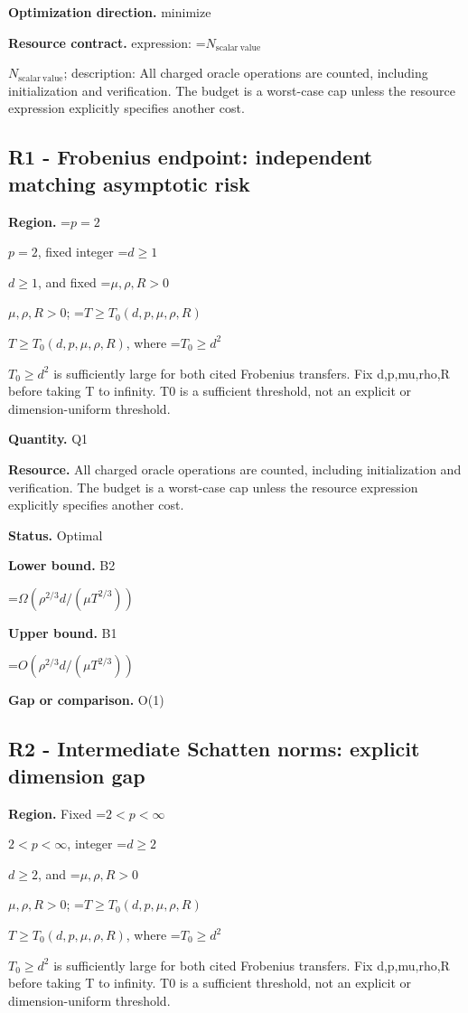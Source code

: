 \documentclass[10pt,a4paper]{article}
\newcommand{\AtlasMath}[1]{\par\begingroup\centering\setbox0=\hbox{$\displaystyle #1$}\ifdim\wd0>1.4\linewidth\typeout{ATLAS WIDE FORMULA: \the\wd0}\fi\ifdim\wd0>\linewidth\resizebox{\linewidth}{!}{\box0}\else\box0\fi\par\endgroup}
\newcommand{\AtlasInlineMath}[1]{\begingroup\setbox0=\hbox{$#1$}\ifdim\wd0>.4\linewidth\endgroup\AtlasMath{#1}\else\endgroup$#1$\fi}
\begin{document}
\textbf{Optimization direction.} minimize



\textbf{Resource contract.} expression: \AtlasInlineMath{N_{\mathrm{scalar\ value}}}; description: All charged oracle operations are counted, including initialization and verification. The budget is a worst-case cap unless the resource expression explicitly specifies another cost.



\subsection{R1 - Frobenius endpoint: independent matching asymptotic risk}


\textbf{Region.} \AtlasInlineMath{p=2}, fixed integer \AtlasInlineMath{d\ge1}, and fixed \AtlasInlineMath{\mu,\rho,R>0}; \AtlasInlineMath{T\ge T_0(d,p,\mu,\rho,R)}, where \AtlasInlineMath{T_0\ge d^2} is sufficiently large for both cited Frobenius transfers. Fix d,p,mu,rho,R before taking T to infinity. T0 is a sufficient threshold, not an explicit or dimension-uniform threshold.



\textbf{Quantity.} Q1



\textbf{Resource.} All charged oracle operations are counted, including initialization and verification. The budget is a worst-case cap unless the resource expression explicitly specifies another cost.



\textbf{Status.} Optimal



\textbf{Lower bound.} B2



\AtlasMath{\Omega(\rho^{2/3}d/(\mu T^{2/3}))}


\textbf{Upper bound.} B1



\AtlasMath{O(\rho^{2/3}d/(\mu T^{2/3}))}


\textbf{Gap or comparison.} O(1)



\subsection{R2 - Intermediate Schatten norms: explicit dimension gap}


\textbf{Region.} Fixed \AtlasInlineMath{2<p<\infty}, integer \AtlasInlineMath{d\ge2}, and \AtlasInlineMath{\mu,\rho,R>0}; \AtlasInlineMath{T\ge T_0(d,p,\mu,\rho,R)}, where \AtlasInlineMath{T_0\ge d^2} is sufficiently large for both cited Frobenius transfers. Fix d,p,mu,rho,R before taking T to infinity. T0 is a sufficient threshold, not an explicit or dimension-uniform threshold.
\end{document}

